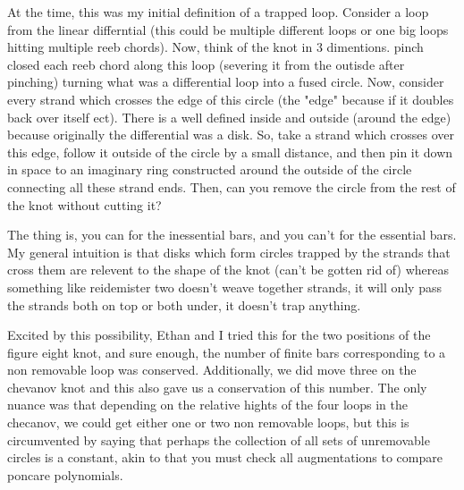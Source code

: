 \documentclass[11pt,oneside]{amsart}
\begin{document}
At the time, this was my initial definition of a trapped loop. Consider a loop from the linear differntial (this could be multiple different loops or one big loops hitting multiple reeb chords). Now, think of the knot in 3 dimentions. pinch closed each reeb chord along this loop (severing it from the outisde after pinching) turning what was a differential loop into a fused circle. Now, consider every strand which crosses the edge of this circle (the "edge" because if it doubles back over itself ect). There is a well defined inside and outside (around the edge) because originally the differential was a disk. So, take a strand which crosses over this edge, follow it outside of the circle by a small distance, and then pin it down in space to an imaginary ring constructed around the outside of the circle connecting all these strand ends. Then, can you remove the circle from the rest of the knot without cutting it? 

The thing is, you can for the inessential bars, and you can't for the essential bars. My general intuition is that disks which form circles trapped by the strands that cross them are relevent to the shape of the knot (can't be gotten rid of) whereas something like reidemister two doesn't weave together strands, it will only pass the strands both on top or both under, it doesn't trap anything. 

Excited by this possibility, Ethan and I tried this for the two positions of the figure eight knot, and sure enough, the number of finite bars corresponding to a non removable loop was conserved. Additionally, we did move three on the chevanov knot and this also gave us a conservation of this number. The only nuance was that depending on the relative hights of the four loops in the checanov, we could get either one or two non removable loops, but this is circumvented by saying that perhaps the collection of all sets of unremovable circles is a constant, akin to that you must check all augmentations to compare poncare polynomials. 
\end{document}
